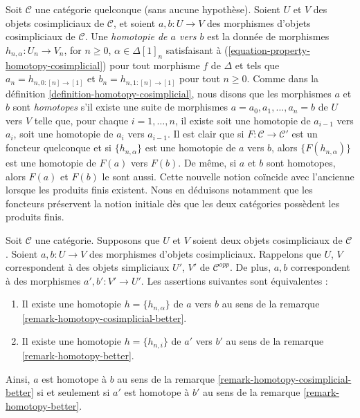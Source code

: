 \begin{remark}
\label{remark-homotopy-cosimplicial-better}
Soit $\mathcal{C}$ une catégorie quelconque (sans aucune hypothèse).
Soient $U$ et $V$ des objets cosimpliciaux de $\mathcal{C}$, et soient
$a, b : U \to V$ des morphismes d'objets cosimpliciaux de $\mathcal{C}$.
Une {\it homotopie de $a$ vers $b$} est la donnée de morphismes
$h_{n, \alpha} : U_n \to V_n$, for $n \geq 0$, $\alpha \in \Delta[1]_n$
satisfaisant à (\ref{equation-property-homotopy-cosimplicial})
pour tout morphisme $f$ de $\Delta$ et tels que
$a_n = h_{n, 0 : [n] \to [1]}$ et $b_n = h_{n, 1 : [n] \to [1]}$
pour tout $n \geq 0$.
Comme dans la définition \ref{definition-homotopy-cosimplicial},
nous disons que les morphismes $a$ et $b$ sont {\it homotopes} s'il existe
une suite de morphismes $a = a_0, a_1, \ldots, a_n = b$ de $U$ vers $V$
telle que, pour chaque $i = 1, \ldots, n$, il existe soit une homotopie de
$a_{i - 1}$ vers $a_i$, soit une homotopie de $a_i$ vers $a_{i - 1}$.
Il est clair que si $F : \mathcal{C} \to \mathcal{C}'$ est un foncteur
quelconque et si $\{h_{n, \alpha}\}$ est une homotopie de $a$ vers $b$, alors
$\{F(h_{n, \alpha})\}$ est une homotopie de $F(a)$ vers $F(b)$.
De même, si $a$ et $b$ sont homotopes, alors $F(a)$ et $F(b)$ le sont aussi.
Cette nouvelle notion coïncide avec l'ancienne lorsque les produits finis
existent. Nous en déduisons notamment que les foncteurs préservent la notion
initiale dès que les deux catégories possèdent les produits finis.
\end{remark}

\begin{lemma}
\label{lemma-compare-homotopies}
Soit $\mathcal{C}$ une catégorie. Supposons que $U$ et $V$ soient deux
objets cosimpliciaux de $\mathcal{C}$. Soient $a, b : U \to V$ des morphismes
d'objets cosimpliciaux. Rappelons que $U$, $V$ correspondent à des objets
simpliciaux $U'$, $V'$ de $\mathcal{C}^{opp}$.
De plus, $a, b$ correspondent à des morphismes $a', b' : V' \to U'$.
Les assertions suivantes sont équivalentes :
\begin{enumerate}
\item Il existe une homotopie $h = \{h_{n, \alpha}\}$ de
$a$ vers $b$ au sens de la remarque \ref{remark-homotopy-cosimplicial-better}.
\item Il existe une homotopie $h = \{h_{n, i}\}$ de $a'$ vers $b'$
au sens de la remarque \ref{remark-homotopy-better}.
\end{enumerate}
Ainsi, $a$ est homotope à $b$ au sens de la
remarque \ref{remark-homotopy-cosimplicial-better} si et seulement si
$a'$ est homotope à $b'$ au sens de la
remarque \ref{remark-homotopy-better}.
\end{lemma}

